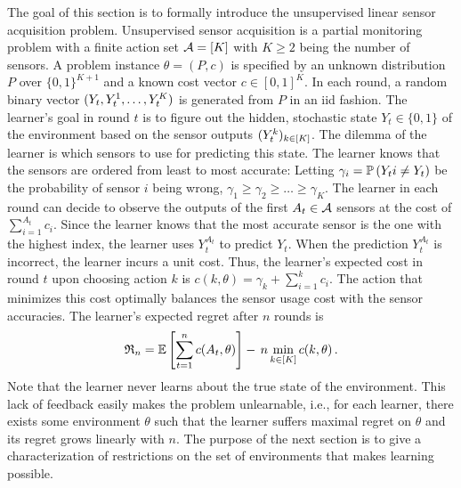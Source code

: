 The goal of this section is to formally introduce the unsupervised linear sensor acquisition problem.
Unsupervised sensor acquisition is a partial monitoring problem with a finite action set $\mathcal{A} = [K]$
with $K\ge 2$ being the number of sensors.
A problem instance $\theta = (P,c)$ is specified by an unknown distribution $P$ over 
$\{0,1\}^{K+1}$ and a known cost vector $c\in [0,1]^K$.
In each round, a random binary vector $(Y_t,Y_t^1,\dots,Y_t^K)$ is generated from $P$ in an iid fashion.
The learner's goal in round $t$ is to figure out 
the hidden, stochastic state $Y_t\in \{0,1\}$ of the environment based on the sensor outputs $(Y_t^{k})_{k\in [K]}$.
The dilemma of the learner is which sensors to use for predicting this state.
The learner knows that the sensors are ordered from least to most accurate:
Letting $\gamma_i  =\mathbb{P}\left(Y_t{i}\ne Y_t\right)$ be the probability of sensor $i$ being wrong,
$\gamma_1\ge \gamma_2 \ge \dots \ge \gamma_K$.
The learner in each round can decide to observe the outputs of the first $A_t\in \mathcal{A}$ sensors
at the cost of $\sum_{i=1}^{A_t} c_i$.
Since the learner knows that the most accurate sensor is the one with the highest index,
the learner uses $Y_t^{A_t}$ to predict $Y_t$.
When the prediction $Y_t^{A_t}$ is incorrect, the learner incurs a unit cost. 
Thus, the learner's expected cost in round $t$ upon choosing action $k$ is
$c(k,\theta) = \gamma_k+\sum_{i=1}^k c_i$.
The action that minimizes this cost optimally balances the sensor usage cost with the sensor accuracies.
The learner's expected regret after $n$ rounds is 
\begin{align*}
\mathfrak{R}_n = \mathbb{E}\left[\sum_{t=1}^n c(A_t,\theta)\right] -\, n \min_{k\in [K]} c(k,\theta)\,.
\end{align*}
Note that the learner never learns about the true state of the environment. 
This lack of feedback easily makes the problem unlearnable, i.e., 
for each learner, there exists some environment $\theta$ such that the learner suffers
maximal regret on $\theta$ and its regret grows linearly with $n$.
The purpose of the next section is to give a characterization of restrictions on the set of environments
that makes learning possible.


